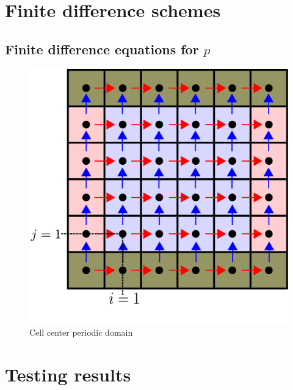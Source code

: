 \documentclass[12pt]{article}
\begin{document}
\section{Finite difference schemes}
    
    
    \subsection{Finite difference equations for $p$}
    \begin{figure}[H]
        \includegraphics[height=0.5\textheight]{../../../media/periodic-BCs}
        \caption{Cell center periodic domain}
        \label{fig:periodic-domain}
    \end{figure}                                                            

\section{Testing results}

\end{document}
